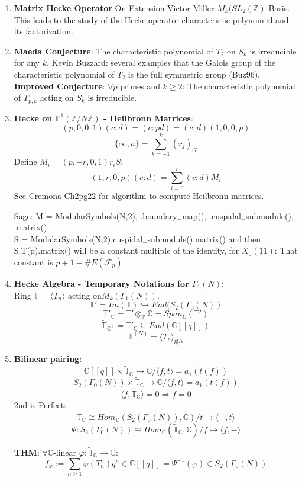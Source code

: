 \documentclass{article}
\newcommand{\C}{\mathbb{C}}
\newcommand{\Z}{\mathbb{Z}}
\newcommand{\PP}{\mathbb{P}}
\newcommand{\FF}{\mathcal{F}}
\newcommand{\ra}{\rightarrow}
\newcommand{\Ra}{\Rightarrow}
\newcommand{\hra}{\hookrightarrow}
\begin{document}
\begin{multicols}{2}
\begin{enumerate}
\item \textbf{Matrix Hecke Operator} On Extension Victor Miller $M_k(SL_2(\Z)$-Basis. This leads to the study of the Hecke operator characteristic polynomial and its factorization.


\item \textbf{Maeda Conjecture}: The characteristic polynomial of $T_2$ on $S_k$ is irreducible for any $k$. Kevin Buzzard: several examples that the Galois group of the characteristic polynomial of $T_2$ is the full symmetric group (Buz96). \textbf{Improved Conjecture}: $\forall p$ primes and $k \geq 2$: The characteristic polynomial of $T_{p,k}$ acting on $S_k$ is irreducible. 



\item \textbf{Hecke on $\PP^1(\Z/N\Z)$ - Heilbronn Matrices}: 
\[(p,0,0,1)(c:d) = (c:pd) = (c:d)(1,0,0,p)\]
\[\{\infty,a\} = \sum_{k=-1}^k (r_j)_G\]
Define $M_i = (p,-r,0,1)r_iS$: 
\[(1,r,0,p)(c:d) = \sum_{i=0}^r (c:d)M_i\]
See Cremona Ch2pg22 for algorithm to compute Heilbronn matrices.

Sage: M = ModularSymbols(N,2), .boundary$_-$map(), .cuspidal$_-$submodule(), .matrix()\\
S = ModularSymbols(N,2).cuspidal$_-$submodule().matrix() and then S.T(p).matrix() will be a constant multiple of the identity, for $X_0(11)$: That constant is $p+1-\#E(\FF_p)$.

\item \textbf{Hecke Algebra - Temporary Notations for $\Gamma_1(N)$}: \\
Ring $\mathbb{T} = \langle T_n \rangle$ acting on$M_k(\Gamma_1(N))$. \\
\[\mathbb{T}' = Im(\mathbb{T}) \hra End(S_2(\Gamma_0(N))\]
\[\mathbb{T}'_\C = \mathbb{T}' \otimes_\Z \C = Span_\C(\mathbb{T}')\]
\[\tilde{\mathbb{T}}_\C: = \mathbb{T}'_\C \subseteq End(\C[[q]])\]
\[\mathbb{T}^{(N)} = \langle T_p \rangle_{p \not|N}\]

\item \textbf{Bilinear pairing}: 
\[\C[[q]] \times \tilde{\mathbb{T}}_\C \ra \C/\langle f, t \rangle = a_1(t(f))\]
\[S_2(\Gamma_0(N)) \times \tilde{\mathbb{T}}_\C \ra \C/\langle f,t \rangle = a_1(t(f))\] 
\[\langle f,\tilde{\mathbb{T}}_\C \rangle = 0 \Ra f = 0\]
2nd is Perfect:
\[\tilde{\mathbb{T}}_\C \cong Hom_\C(S_2(\Gamma_0(N)), \C)/ t \mapsto \langle -, t \rangle\]
\[\Psi:  S_2(\Gamma_0(N)) \cong Hom_\C(\tilde{\mathbb{T}}_\C,\C)/ f \mapsto \langle f, - \rangle\]

\textbf{THM}: $\forall \C$-linear $\varphi: \tilde{\mathbb{T}}_\C \ra \C$: 
\[f_\varphi:= \sum_{n \geq 1} \varphi(T_n) q^n \in \C[[q]] = \Psi^{-1}(\varphi) \in S_2(\Gamma_0(N))\]


\end{enumerate}
\end{multicols}
\end{document}
